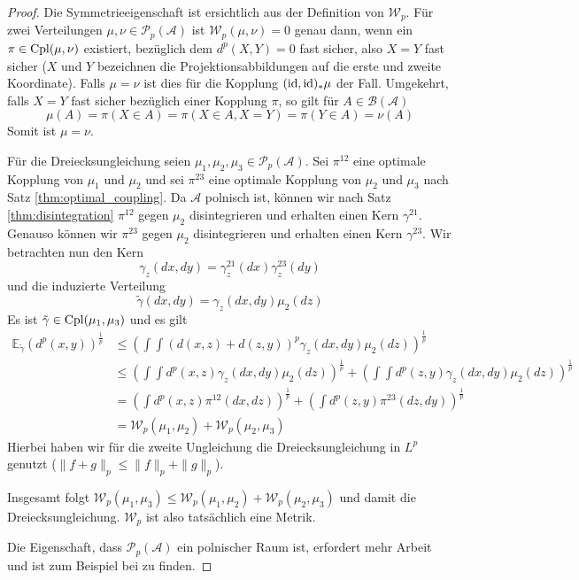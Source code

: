 \begin{proof}
    Die Symmetrieeigenschaft ist ersichtlich aus der Definition von $\mathcal{W}_p$. Für zwei Verteilungen $\mu,\nu \in \mathcal{P}_p(\mathcal{A})$ ist $\mathcal{W}_p(\mu, \nu) = 0$ genau dann, wenn ein $\pi \in \operatorname{Cpl}(\mu,\nu)$ existiert, bezüglich dem $d^p(X,Y)=0$ fast sicher, also $X=Y$ fast sicher ($X$ und $Y$ bezeichnen die Projektionsabbildungen auf die erste und zweite Koordinate). Falls $\mu=\nu$ ist dies für die Kopplung $(\operatorname{id}, \operatorname{id})_*\mu$ der Fall. Umgekehrt, falls $X=Y$ fast sicher bezüglich einer Kopplung $\pi$, so gilt für $A \in \mathcal{B}(\mathcal{A})$ 
    $$\mu(A) = \pi(X \in A) = \pi(X\in A, X=Y) = \pi(Y \in A) = \nu(A)$$ 
    Somit ist $\mu=\nu$.

    Für die Dreiecksungleichung seien $\mu_1, \mu_2, \mu_3 \in \mathcal{P}_p(\mathcal{A})$. Sei $\pi^{12}$ eine optimale Kopplung von $\mu_1$ und $\mu_2$ und sei $\pi^{23}$ eine optimale Kopplung von $\mu_2$ und $\mu_3$ nach Satz \ref{thm:optimal_coupling}. Da $\mathcal{A}$ polnisch ist, können wir nach Satz \ref{thm:disintegration} $\pi^{12}$ gegen $\mu_2$ disintegrieren und erhalten einen Kern $\gamma^{21}$. Genauso können wir $\pi^{23}$ gegen $\mu_2$ disintegrieren und erhalten einen Kern $\gamma^{23}$. Wir betrachten nun den Kern
    $$\gamma_z(dx, dy) = \gamma_z^{21}(dx)\gamma_z^{23}(dy)$$
    und die induzierte Verteilung
    $$\tilde{\gamma}(dx, dy) = \gamma_z(dx,dy)\mu_2(dz)$$
    Es ist $\tilde{\gamma} \in \operatorname{Cpl}(\mu_1, \mu_3)$ und es gilt 
    \begin{align*}
        \mathbb{E}_{\tilde{\gamma}}(d^p(x,y))^\frac{1}{p} &\leq \left( \int \int \left( d(x,z) + d(z, y) \right)^p \gamma_z(dx,dy)\mu_2(dz) \right)^\frac{1}{p} \\
        &\leq \left(\int\!\!\!\int\!\!d^p(x,z) \gamma_z(dx,dy) \mu_2(dz)\right)^\frac{1}{p} + \left( \int\!\!\!\int\!\! d^p(z,y) \gamma_z(dx,dy) \mu_2(dz)\right)^\frac{1}{p} \\
        &= \left( \int d^p(x,z)\pi^{12}(dx, dz)  \right)^\frac{1}{p} + \left(\int d^p(z,y) \pi^{23}(dz,dy) \right)^\frac{1}{p} \\
        &= \mathcal{W}_p(\mu_1, \mu_2) + \mathcal{W}_p(\mu_2, \mu_3)
    \end{align*}
    Hierbei haben wir für die zweite Ungleichung die Dreiecksungleichung in $L^p$ genutzt ($\|f+g\|_p \leq \|f\|_p + \|g\|_p$). 

    Insgesamt folgt $\mathcal{W}_p(\mu_1, \mu_3) \leq \mathcal{W}_p(\mu_1, \mu_2) + \mathcal{W}_p(\mu_2, \mu_3)$ und damit die Dreiecksungleichung. $\mathcal{W}_p$ ist also tatsächlich eine Metrik. 

    Die Eigenschaft, dass $\mathcal{P}_p(\mathcal{A})$ ein polnischer Raum ist, erfordert mehr Arbeit und ist zum Beispiel bei \cite[Satz 6.18]{villani} zu finden.
\end{proof}

